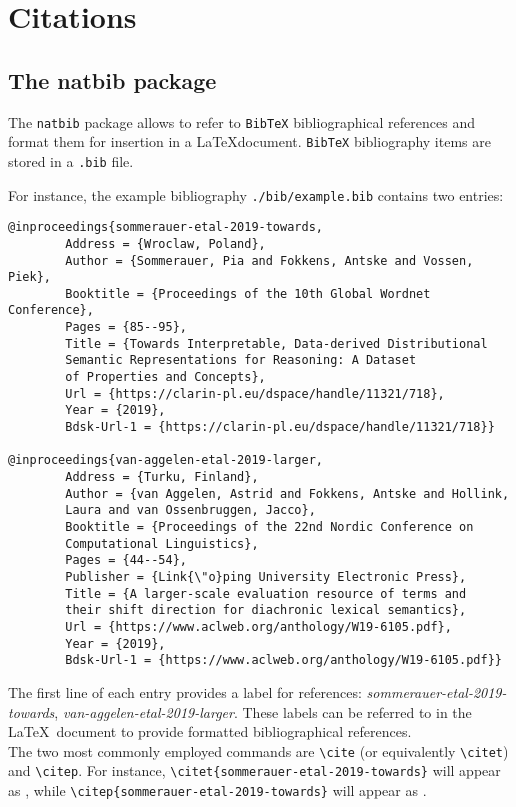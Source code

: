 \section{Citations}
\subsection{The natbib package}
The \texttt{natbib} package allows to refer to \texttt{BibTeX} bibliographical references and format them for insertion in a \LaTeX document. \texttt{BibTeX} bibliography items are stored in a \texttt{.bib} file.

For instance, the example bibliography \texttt{./bib/example.bib} contains two entries:
\begin{verbatim}
@inproceedings{sommerauer-etal-2019-towards,
        Address = {Wroclaw, Poland},
        Author = {Sommerauer, Pia and Fokkens, Antske and Vossen, Piek},
        Booktitle = {Proceedings of the 10th Global Wordnet Conference},
        Pages = {85--95},
        Title = {Towards Interpretable, Data-derived Distributional 
		Semantic Representations for Reasoning: A Dataset 
		of Properties and Concepts},
        Url = {https://clarin-pl.eu/dspace/handle/11321/718},
        Year = {2019},
        Bdsk-Url-1 = {https://clarin-pl.eu/dspace/handle/11321/718}}

@inproceedings{van-aggelen-etal-2019-larger,
        Address = {Turku, Finland},
        Author = {van Aggelen, Astrid and Fokkens, Antske and Hollink, 
		Laura and van Ossenbruggen, Jacco},
        Booktitle = {Proceedings of the 22nd Nordic Conference on 
		Computational Linguistics},
        Pages = {44--54},
        Publisher = {Link{\"o}ping University Electronic Press},
        Title = {A larger-scale evaluation resource of terms and 
		their shift direction for diachronic lexical semantics},
        Url = {https://www.aclweb.org/anthology/W19-6105.pdf},
        Year = {2019},
        Bdsk-Url-1 = {https://www.aclweb.org/anthology/W19-6105.pdf}}

\end{verbatim}

The first line of each entry provides a label for references: {\em sommerauer-etal-2019-towards}, {\em van-aggelen-etal-2019-larger}. These labels can be referred to in the \LaTeX\ document to provide formatted bibliographical references. \\

The two most commonly employed commands are \verb|\cite| (or equivalently \verb|\citet|) and \verb|\citep|. For instance, \verb|\citet{sommerauer-etal-2019-towards}| will appear as \citet{sommerauer-etal-2019-towards}, while \verb|\citep{sommerauer-etal-2019-towards}| will appear as \citep{sommerauer-etal-2019-towards}.

